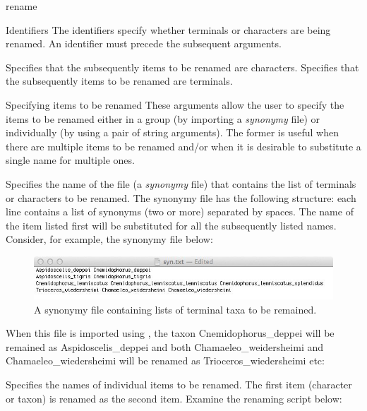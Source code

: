 \begin{command}{rename}{}
\begin{arguments}
\begin{argumentgroup}{Identifiers}
{The identifiers specify whether terminals or characters are being
renamed. An identifier must precede the subsequent arguments.}

{Specifies that the subsequently items to be renamed are characters.} 
{}
{Specifies that the subsequently items to be renamed are terminals.} 
{}
\end{argumentgroup}

\begin{argumentgroup}{Specifying items to be renamed}
{These arguments allow the user to specify the items to be renamed either in a group 
(by importing a \emph{synonymy} file) or individually (by using a pair of string arguments).
The former is useful when there are multiple items to be renamed and/or when it is
desirable to substitute a single name for multiple ones.}

{Specifies the name of the file (a \emph{synonymy} file) that contains the list of
terminals or characters to be renamed. The synonymy file has the following structure:
each line contains a list of synonyms (two or more) separated by spaces. The name of the
item listed first will be substituted for all the subsequently listed names. Consider,
for example, the synonymy file below:

\begin{figure}[th!]
\begin{center}
\includegraphics[width=1.0\textwidth]{doc/figures/syn.jpg}
\end{center}
\caption{A synonymy file containing lists of terminal taxa to be remained.}
\label{fig:syn}
\end{figure}

When this file is imported using , the taxon
Cnemidophorus\_deppei will be remained as Aspidoscelis\_deppei and both Chamaeleo\_weidersheimi 
and Chamaeleo\_wiedersheimi will be renamed as Trioceros\_wiedersheimi etc:}
{}

{Specifies the names of individual items to be renamed. The first item (character or taxon) is renamed
as the second item.        
Examine the renaming script below: 

}
\end{argumentgroup}
\end{arguments}
\end{command}
